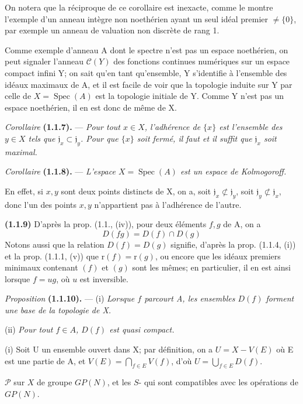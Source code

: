 On notera que la réciproque de ce corollaire est inexacte, comme le montre l'exemple d'un anneau intègre non noethérien ayant un seul idéal premier $\ne\{0\}$, par exemple un anneau de valuation non discrète de rang 1.

Comme exemple d'anneau A dont le spectre n'est pas un espace noethérien, on peut signaler l'anneau $\mathcal C(Y)$ des fonctions continues numériques sur un espace compact infini Y; on sait qu'en tant qu'ensemble, Y s'identifie à l'ensemble des idéaux maximaux de A, et il est facile de voir que la topologie induite sur Y par celle de $X=\operatorname{Spec}(A)$ est la topologie initiale de Y. Comme Y n'est pas un espace noethérien, il en est donc de même de X.

\textit{Corollaire} \textbf{(1.1.7).} --- \textit{Pour tout $x\in X$, l'adhérence de $\{x\}$ est l'ensemble des $y\in X$ tels que $\mathfrak j_x\subset\mathfrak j_y$. Pour que $\{x\}$ soit fermé, il faut et il suffit que $\mathfrak j_x$ soit maximal.}

\textit{Corollaire} \textbf{(1.1.8).} --- \textit{L'espace $X=\operatorname{Spec}(A)$ est un espace de Kolmogoroff.}

En effet, si $x,y$ sont deux points distincts de X, on a, soit $\mathfrak j_x\not\subset\mathfrak j_y$, soit $\mathfrak j_y\not\subset\mathfrak j_x$, donc l'un des points $x,y$ n'appartient pas à l'adhérence de l'autre.

\textbf{(1.1.9)} D'après la prop. (1.1., (iv)), pour deux éléments $f,g$ de A, on a
\[
D(fg)=D(f)\cap D(g)\tag{1.1.9.1}
\]
Notons aussi que la relation $D(f)=D(g)$ signifie, d'après la prop. (1.1.4, (i)) et la prop. (1.1.1, (v)) que $\mathrm r(f)=\mathrm r(g)$, ou encore que les idéaux premiers minimaux contenant $(f)$ et $(g)$ sont les mêmes; en particulier, il en est ainsi lorsque $f=ug$, où $u$ est inversible.

\textit{Proposition} \textbf{(1.1.10).} --- (i) \textit{Lorsque $f$ parcourt A, les ensembles $D(f)$ forment une base de la topologie de X.}

(ii) \textit{Pour tout $f\in A$, $D(f)$ est quasi compact.} 

(i) Soit U un ensemble ouvert dans X; par définition, on a $U=X-V(E)$ où E est une partie de A, et $V(E)=\bigcap_{f\in E}V(f)$, d'où $U=\bigcup_{f\in E}D(f)$.

 $\mathcal P$  sur $X$ de groupe $GP(N)$, et les $S$-
qui sont compatibles avec les opérations de $GP(N)$.

